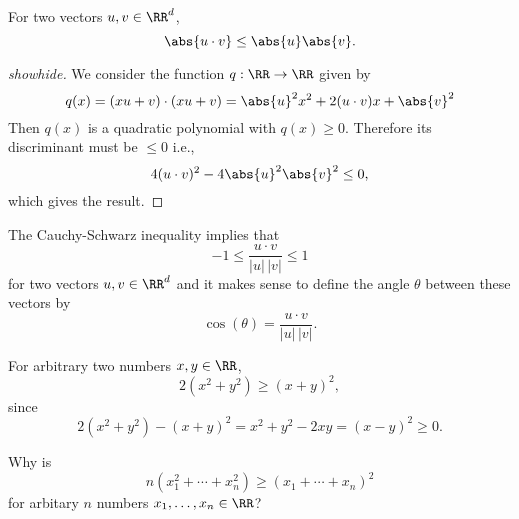 \documentclass{article}
\begin{document}
\begin{theorem}\label{cs}
  For two vectors $u, v\in \RR^d$,
  $$
  \abs{u\cdot v} \leq \abs{u} \abs{v}.
  $$
\end{theorem}
  \begin{proof}[showhide]
    We consider the function $q:\RR\rightarrow \RR$ given by
    $$
    q(x) = (x u + v)\cdot (x u + v) = \abs{u}^2 x^2 + 2 (u\cdot v) x + \abs{v}^2
    $$
    Then $q(x)$ is a quadratic polynomial with $q(x)\geq 0$. Therefore
    its discriminant must be $\leq 0$ i.e.,
    $$
    4 (u\cdot v)^2 - 4 \abs{u}^2 \abs{v}^2 \leq 0,
    $$  
    which gives the result.
  \end{proof}


The Cauchy-Schwarz inequality
implies that 
$$
-1 \leq \frac{u\cdot v}{|u|\, |v|} \leq 1
$$
for two vectors $u, v\in \RR^d$ and it makes sense to define the angle
$\theta$ between these vectors by
\begin{equation}\label{cossim}
\cos(\theta) = 
\frac{u \cdot v}{|u|\, |v|}.
\end{equation}

\beginshex
For arbitrary two numbers $x, y\in \RR$, 
$$
2 (x^2 + y^2) \geq (x + y)^2,
$$
since
$$
2(x^2 + y^2) - (x + y)^2 = x^2 + y^2 - 2 x y = (x - y)^2\geq 0.
$$

Why is
$$
n (x_1^2 + \cdots + x_n^2) \geq (x_1 + \cdots + x_n)^2
$$
for arbitary $n$ numbers $x_1, \dots, x_n\in \RR$?
\endshex
\end{document}
